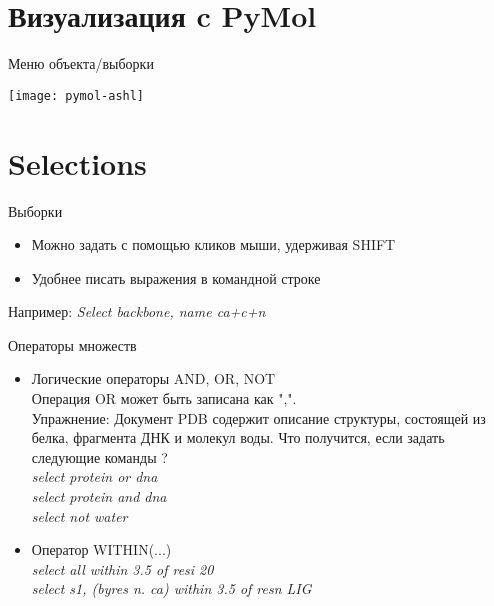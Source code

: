   
  \section{Визуализация c PyMol}



  \begin{frame}{Меню объекта/выборки}
	\begin{center}
          \texttt{[image: pymol-ashl]}
	  \end{center}
  \end{frame}


\section{Selections} 
\begin{frame}{Выборки}
	\begin{itemize}
		\item Можно задать с помощью кликов мыши, удерживая SHIFT
		\item Удобнее писать выражения в командной строке
		\end{itemize}

	Например:
	\textit{Select backbone, name ca+c+n }
\end{frame}

\begin{frame}{Операторы множеств}
	\begin{itemize}
		\item Логические операторы AND, OR,  NOT\\
					Операция OR может быть записана как ",". \\
				{ \tiny
					Упражнение: Документ PDB содержит описание структуры, состоящей из белка,
					фрагмента ДНК и молекул воды. Что получится, если задать следующие
				команды ?}\\
				\textit{
					select protein or dna \\
					select protein and dna\\
				select not water}
			\item Оператор WITHIN(...) \\
				\textit{
					select all within 3.5 of resi 20\\
				select s1, (byres n. ca) within 3.5 of resn LIG}
	\end{itemize}
\end{frame}

